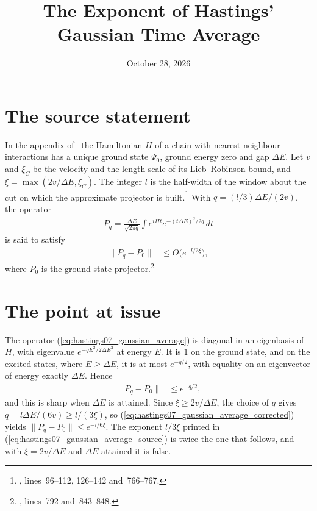 \documentclass{article}
\title{The Exponent of Hastings' Gaussian Time Average}
\author{}
\date{October 28, 2026}
\begin{document}
\maketitle
{}

\section{The source statement}

In the appendix of~\cite{Hastings2007AreaLaw} the Hamiltonian $H$ of a chain
with nearest-neighbour interactions has a unique ground state $\Psi_0$, ground
energy zero and gap $\Delta E$. Let $v$ and $\xi_C$ be the velocity and the
length scale of its Lieb--Robinson bound, and
$\xi=\max(2v/\Delta E,\xi_C)$. The integer $l$ is the half-width of the
window about the cut on which the approximate projector is built.\footnote{,
    lines~96--112, 126--142 and~766--767.}
With $q=(l/3)\Delta E/(2v)$, the operator
\begin{align}
    P_q=\frac{\Delta E}{\sqrt{2\pi q}}\int e^{iHt}e^{-(t\Delta E)^2/2q}\,dt
    \label{eq:hastings07_gaussian_average}
\end{align}
is said to satisfy
\begin{align}
    \|P_q-P_0\| & \le O\bigl(e^{-l/3\xi}\bigr),
    \label{eq:hastings07_gaussian_average_source}
\end{align}
where $P_0$ is the ground-state projector.\footnote{,
    lines~792 and~843--848.}

\section{The point at issue}

The operator (\ref{eq:hastings07_gaussian_average}) is diagonal in an eigenbasis
of $H$, with eigenvalue $e^{-qE^2/2\Delta E^2}$ at energy $E$. It is $1$ on the
ground state, and on the excited states, where $E\ge\Delta E$, it is at most
$e^{-q/2}$, with equality on an eigenvector of energy exactly $\Delta E$.
Hence
\begin{align}
    \|P_q-P_0\| & \le e^{-q/2},
    \label{eq:hastings07_gaussian_average_corrected}
\end{align}
and this is sharp when $\Delta E$ is attained. Since $\xi\ge2v/\Delta E$, the
choice of $q$ gives $q=l\Delta E/(6v)\ge l/(3\xi)$, so
(\ref{eq:hastings07_gaussian_average_corrected}) yields
$\|P_q-P_0\|\le e^{-l/6\xi}$. The exponent $l/3\xi$ printed in
(\ref{eq:hastings07_gaussian_average_source}) is twice the one that follows,
and with $\xi=2v/\Delta E$ and $\Delta E$ attained it is false.
\end{document}
